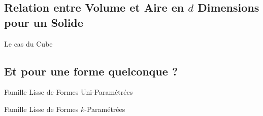 \documentclass{beamercours}
\begin{document}
        \subsection{Relation entre Volume et Aire en $d$ Dimensions pour un Solide}
            \begin{frame}{Le cas du Cube}
                
            \end{frame}


        \subsection{Et pour une forme quelconque ?}
            \begin{frame}{Famille Lisse de Formes Uni-Paramétrées}
                
            \end{frame}

            \begin{frame}{Famille Lisse de Formes $k$-Paramétrées}
                
            \end{frame}
\end{document}
